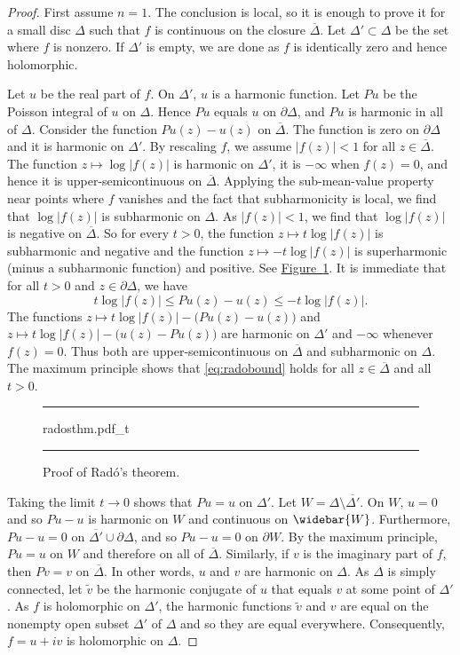\documentclass[12pt,openany]{book}
\newcommand{\sabs}[1]{\lvert {#1} \rvert}
\newcommand{\abs}[1]{\left\lvert {#1} \right\rvert}
\theoremstyle{plain}
\theoremstyle{remark}
\theoremstyle{definition}
\newenvironment{myfig}{%
\begin{figure}[h!t]
\noindent\rule{\textwidth}{0.5pt}\vspace{12pt}\par\centering}%
{\par\noindent\rule{\textwidth}{0.5pt}
\end{figure}}
\theoremstyle{exercise}
\theoremstyle{example}
\newcommand{\figureref}[1]{\hyperref[#1]{Figure~\ref*{#1}}}
\begin{document}
\begin{proof}
First assume $n=1$.  The conclusion is local, so it is
enough to prove it for a small disc $\Delta$ such that $f$ is continuous
on the closure $\overline{\Delta}$.  Let $\Delta' \subset \Delta$ be the set
where $f$ is nonzero.  If $\Delta'$ is empty, we are done as
$f$ is identically zero and hence holomorphic.

Let $u$ be the real part of $f$.  On $\Delta'$, $u$ is a harmonic function.
Let $Pu$ be the Poisson integral of $u$ on $\Delta$.  Hence $Pu$
equals $u$ on $\partial \Delta$, and $Pu$ is harmonic in all of $\Delta$.
Consider the function
$Pu(z) - u(z)$ on $\overline{\Delta}$.  The function is zero
on $\partial \Delta$ and it is harmonic on $\Delta'$.  By rescaling $f$,
we assume $\abs{f(z)} < 1$ for all $z \in \overline{\Delta}$.
The function $z \mapsto \log \sabs{f(z)}$ is harmonic on $\Delta'$, it is
$-\infty$ when $f(z) = 0$, and hence it is upper-semicontinuous on
$\overline{\Delta}$.
Applying
the sub-mean-value property near points where $f$ vanishes
and the fact that subharmonicity is local, we find that
$\log \sabs{f(z)}$ is subharmonic on $\Delta$.
As $\sabs{f(z)} < 1$, we find that
$\log \sabs{f(z)}$ is negative on $\overline{\Delta}$.
So for every $t > 0$,
the function
$z \mapsto t \log \abs{f(z)}$ is subharmonic and negative
and the function
$z \mapsto -t \log \abs{f(z)}$ is superharmonic
(minus a subharmonic function) and positive.
See \figureref{fig:radosthm}.
It is immediate that for all $t > 0$ and
$z \in \partial \Delta$,
we have
\begin{equation} \label{eq:radobound}
t \log \abs{f(z)} \leq Pu(z)-u(z) \leq -t \log \abs{f(z)}  .
\end{equation}
The functions
$z \mapsto t \log \abs{f(z)} - \bigl(Pu(z)-u(z)\bigr)$
and
$z \mapsto t \log \abs{f(z)} - \bigl(u(z)-Pu(z)\bigr)$
are harmonic on $\Delta'$ and $-\infty$ whenever $f(z)=0$.
Thus both are upper-semicontinuous on $\overline{\Delta}$
and subharmonic on $\Delta$.
The maximum principle shows that
\eqref{eq:radobound} holds
for all $z \in \overline{\Delta}$ and all $t > 0$.

\begin{myfig}
{radosthm.pdf_t}
\caption{Proof of Rad\'o's theorem.\label{fig:radosthm}}
\end{myfig}

Taking the limit
$t \to 0$ shows that $Pu = u$ on $\Delta'$.
Let $W = \Delta \setminus \overline{\Delta'}$.
On $W$, $u=0$ and so $Pu-u$ is harmonic on $W$
and continuous on $\widebar{W}$.  Furthermore,
$Pu-u=0$ on $\overline{\Delta'} \cup \partial \Delta$,
and so $Pu-u=0$ on $\partial W$.  By the maximum principle, $Pu=u$ on $W$
and therefore on all of $\overline{\Delta}$.
Similarly, if $v$ is the imaginary part of $f$, then $Pv = v$ on
$\overline{\Delta}$.
In other words, $u$ and $v$ are harmonic on $\Delta$.
As $\Delta$ is simply connected,
let $\tilde{v}$ be the harmonic conjugate of $u$ that equals $v$ at
some point of $\Delta'$.  As $f$ is holomorphic on $\Delta'$,
the harmonic functions $\tilde{v}$ and $v$
are equal on the nonempty open subset $\Delta'$ of $\Delta$ and so
they are equal everywhere.  Consequently, $f = u +iv$ is holomorphic on
$\Delta$.


\end{proof}
\end{document}
